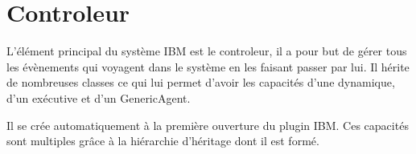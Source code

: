 \section{Controleur}
L'élément principal du système IBM est le controleur, il a pour but de gérer tous les évènements qui voyagent dans le système en les faisant passer par lui. Il hérite de nombreuses classes ce qui lui permet d'avoir les capacités d'une dynamique, d'un exécutive et d'un GenericAgent.\\
\begin{minipage}{\linewidth}%
\end{minipage}

Il se crée automatiquement à la première ouverture du plugin IBM. Ces capacités sont multiples grâce à la hiérarchie d'héritage dont il est formé.
